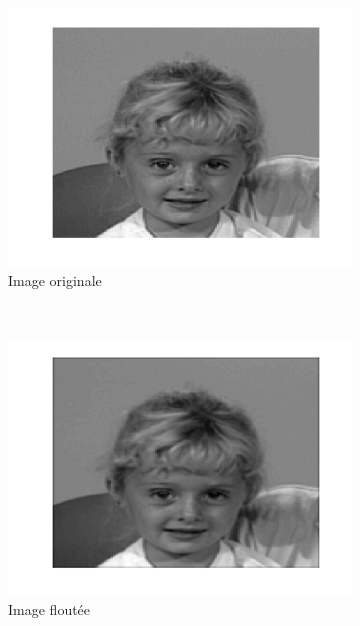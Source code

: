 \begin{figure}
  \centering
  \begin{subfigure}[b]{0.45\textwidth}
    \includegraphics[width=\textwidth]{Q2/original_20.png}
    \caption{Image originale}
    \label{fig:a2original}
  \end{subfigure}%
  ~ %
  \begin{subfigure}[b]{0.45\textwidth}
    \includegraphics[width=\textwidth]{Q2/blurred_20.png}
    \caption{Image floutée}
    \label{fig:a2blurred}
  \end{subfigure}
  \begin{subfigure}[b]{0.45\textwidth}

\end{subfigure}
\end{figure}

